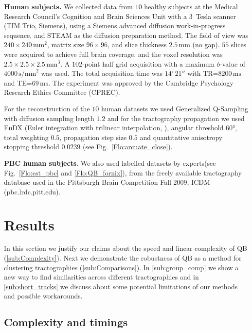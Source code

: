 \documentclass{bioinfo}
\begin{document}
\begin{methods}
\textbf{Human subjects.} We collected data from $10$ healthy subjects at
the Medical Research Council's Cognition and Brain Sciences Unit with a
3~Tesla scanner (TIM Trio, Siemens), using a Siemens advanced diffusion
work-in-progress sequence, and STEAM \citep{merboldt1992diffusion,MAB04}
as the diffusion preparation method. The field of view was
$240\times240\,\textrm{mm}^{2}$, matrix size $96\times96$, and slice
thickness $2.5\,\textrm{mm}$ (no gap).  $55$ slices were acquired to
achieve full brain coverage, and the voxel resolution was
$2.5\times2.5\times2.5\,\textrm{mm}^{3}$. A $102$-point half grid
acquisition \citep{Yeh2010} with a maximum $b$-value of $4000\,
\textrm{s/mm}^{2}$ was used.  The total acquisition time was $14'\,21''$
with TR=$8200\,\textrm{ms}$ and TE=$69\,\textrm{ms}$. The experiment was
approved by the Cambridge Psychology Research Ethics Committee (CPREC).

For the reconstruction of the $10$ human datasets we used Generalized
Q-Sampling \citep{Yeh2010} with diffusion sampling length $1.2$ and for
the tractography propagation we used EuDX (Euler integration with
trilinear interpolation, \citet{Garyfallidis_thesis}), angular threshold
\ang{60}, total weighting $0.5$, propagation step size $0.5$ and
quantitative anisotropy stopping threshold $0.0239$ (see
Fig.~\ref{Flo:arcuate_close}).

\textbf{PBC human subjects}. We also used labelled datasets by
experts(see Fig.~\ref{Flo:cst_pbc} and \ref{Flo:QB_fornix}), from the
freely available tractography database used in the Pittsburgh Brain
Competition Fall $2009$, ICDM (pbc.lrdc.pitt.edu).

\end{methods}

\section{Results}

In this section we justify our claims about the speed and linear
complexity of QB (\ref{sub:Complexity}). Next we demonstrate the
robustness of QB as a method for clustering tractographies
(\ref{sub:Comparisons}). In \ref{sub:group_comp} we show a new way to
find similarities across different tractographies and
in \ref{sub:short_tracks} we discuss about some potential limitations
of our methods and possible workarounds.

\subsection{Complexity and timings\label{sub:Complexity}}
\end{document}
